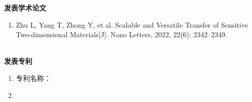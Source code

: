
\Work

\noindent
\textbf{发表学术论文}
\begin{enumerate}
	\renewcommand{\labelenumi}{[\theenumi]}
	\item Zhu L, Yang T, Zhong Y, et al. Scalable and Versatile Transfer of Sensitive Two-dimensional Materials[J]. Nano Letters, 2022, 22(6): 2342–2349.
\end{enumerate}

~\\

\noindent
\textbf{发表专利}
\begin{enumerate}
	\item 专利名称：
	\item 
\end{enumerate}